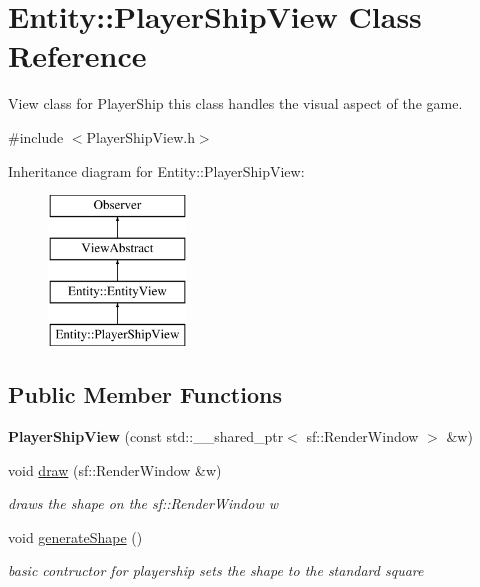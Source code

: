 \hypertarget{classEntity_1_1PlayerShipView}{}\section{Entity\+:\+:Player\+Ship\+View Class Reference}
\label{classEntity_1_1PlayerShipView}


View class for Player\+Ship this class handles the visual aspect of the game.  




{\ttfamily \#include $<$Player\+Ship\+View.\+h$>$}

Inheritance diagram for Entity\+:\+:Player\+Ship\+View\+:\begin{figure}[H]
\begin{center}
\leavevmode
\includegraphics[height=4.000000cm]{classEntity_1_1PlayerShipView}
\end{center}
\end{figure}
\subsection*{Public Member Functions}
\begin{DoxyCompactItemize}
\item 
\mbox{\label{classEntity_1_1PlayerShipView_adabee8b35991da5679fc633692b6425e}} 
{\bfseries Player\+Ship\+View} (const std\+::\+\_\+\+\_\+shared\+\_\+ptr$<$ sf\+::\+Render\+Window $>$ \&w)
\item 
void \hyperlink{classEntity_1_1PlayerShipView_ad9767510af4af87a4b67182065a1bf6c}{draw} (sf\+::\+Render\+Window \&w)
\begin{DoxyCompactList}\small\item\em draws the shape on the sf\+::\+Render\+Window w \end{DoxyCompactList}\item 
\mbox{\label{classEntity_1_1PlayerShipView_a1a3e9f8b78fc6fbe450b72dc5e39e622}} 
void \hyperlink{classEntity_1_1PlayerShipView_a1a3e9f8b78fc6fbe450b72dc5e39e622}{generate\+Shape} ()
\begin{DoxyCompactList}\small\item\em basic contructor for playership sets the shape to the standard square \end{DoxyCompactList}\end{DoxyCompactItemize}
